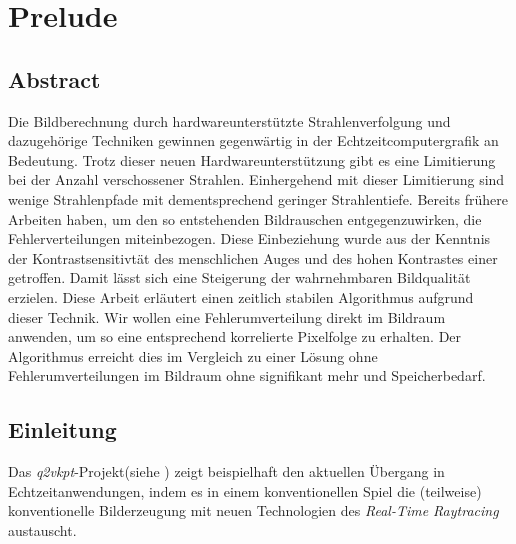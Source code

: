 \newcommand{\uproman}[1]{\uppercase\expandafter{\romannumeral#1}}
\newcommand{\lowroman}[1]{\romannumeral#1\relax}

\chapter{Prelude}
\label{ch:Introduction}

\section{Abstract}

\vspace*{\fill}

Die Bildberechnung durch hardwareunterstützte Strahlenverfolgung und dazugehörige Techniken gewinnen gegenwärtig in der Echtzeitcomputergrafik an Bedeutung. 
Trotz dieser neuen Hardwareunterstützung gibt es eine Limitierung bei der Anzahl verschossener Strahlen. Einhergehend mit dieser Limitierung sind 
wenige Strahlenpfade mit dementsprechend geringer Strahlentiefe. Bereits frühere Arbeiten haben, um den so entstehenden Bildrauschen entgegenzuwirken,
die  Fehlerverteilungen miteinbezogen. Diese Einbeziehung wurde aus der Kenntnis der Kontrastsensitivtät des menschlichen Auges
und des hohen Kontrastes einer  getroffen. Damit lässt sich eine Steigerung der wahrnehmbaren Bildqualität erzielen.
Diese Arbeit erläutert einen zeitlich stabilen Algorithmus aufgrund dieser Technik. Wir wollen eine Fehlerumverteilung direkt im Bildraum anwenden, um so eine entsprechend 
korrelierte Pixelfolge zu erhalten. Der Algorithmus erreicht dies im Vergleich zu einer Lösung ohne Fehlerumverteilungen im Bildraum ohne signifikant mehr
 und Speicherbedarf.
\vfill

\newpage

\section{Einleitung}
\vspace*{\fill}

Das \textit{q2vkpt}-Projekt(siehe \cite{Sch19}) zeigt beispielhaft den aktuellen Übergang in Echtzeitanwendungen, indem es in einem konventionellen Spiel die (teilweise) konventionelle Bilderzeugung 
mit neuen Technologien des \textit{Real-Time Raytracing} austauscht.

